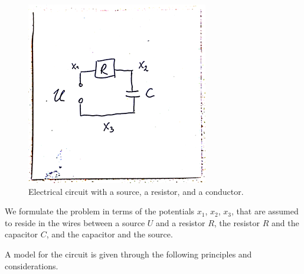 \documentclass[]{book}
\theoremstyle{definition}
\theoremstyle{definition}
\theoremstyle{definition}
\theoremstyle{remark}
\begin{document}
\begin{figure}

{\centering \includegraphics[width=0.4\linewidth]{pics/circuit} 

}

\caption{Electrical circuit with a source, a resistor, and a conductor.}\label{fig:circuit}
\end{figure}

We formulate the problem in terms of the potentials \(x_1\), \(x_2\), \(x_3\), that are assumed to reside in the wires between a source \(U\) and a resistor \(R\), the resistor \(R\) and the capacitor \(C\), and the capacitor and the source.

A model for the circuit is given through the following principles and considerations.
\end{document}
